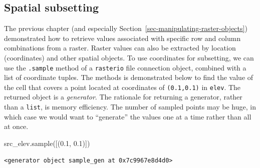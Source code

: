 \documentclass[
  letterpaper,
]{krantz}
\newenvironment{Shaded}{\begin{snugshade}}{\end{snugshade}}
\newcommand{\FloatTok}[1]{\textcolor[rgb]{0.68,0.00,0.00}{#1}}
\newcommand{\NormalTok}[1]{\textcolor[rgb]{0.00,0.23,0.31}{#1}}
\begin{document}
\subsection{Spatial subsetting}\label{sec-spatial-subsetting-raster}

The previous chapter (and especially
Section~\ref{sec-manipulating-raster-objects}) demonstrated how to
retrieve values associated with specific row and column combinations
from a raster. Raster values can also be extracted by location
(coordinates) and other spatial objects. To use coordinates for
subsetting, we can use the \texttt{.sample} method of a
\texttt{rasterio} file connection object, combined with a list of
coordinate tuples. The methods is demonstrated below to find the value
of the cell that covers a point located at coordinates of
\texttt{(0.1,0.1)} in \texttt{elev}. The returned object is a
\emph{generator}. The rationale for returning a generator, rather than a
\texttt{list}, is memory efficiency. The number of sampled points may be
huge, in which case we would want to ``generate'' the values one at a
time rather than all at once.

\begin{Shaded}
\begin{Highlighting}[]
\NormalTok{src\_elev.sample([(}\FloatTok{0.1}\NormalTok{, }\FloatTok{0.1}\NormalTok{)])}
\end{Highlighting}
\end{Shaded}

\begin{verbatim}
<generator object sample_gen at 0x7c9967e8d4d0>
\end{verbatim}
\end{document}
